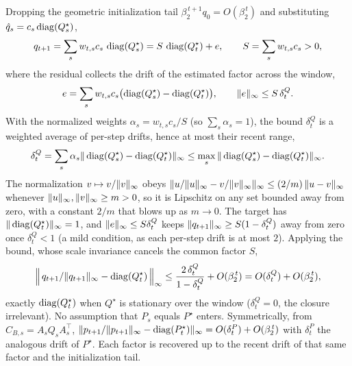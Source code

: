 Dropping the geometric initialization tail $\beta_2^{\,t+1}q_0=O(\beta_2^{\,t})$
and substituting $\hat q_s=c_s\operatorname{diag}(Q^\star_s)$,
\[
  q_{t+1}
  =\sum_s w_{t,s}c_s\,\operatorname{diag}(Q^\star_s)
  =S\,\operatorname{diag}(Q^\star_t)+e,
  \qquad
  S=\sum_s w_{t,s}c_s>0,
\]
where the residual collects the drift of the estimated factor across the window,
\[
  e=\sum_s w_{t,s}c_s\bigl(\operatorname{diag}(Q^\star_s)-\operatorname{diag}(Q^\star_t)\bigr),
  \qquad
  \| e\|_\infty\le S\,\delta^Q_t.
\]
With the normalized weights $\alpha_s=w_{t,s}c_s/S$ (so $\sum_s\alpha_s=1$), the
bound $\delta^Q_t$ is a weighted average of per-step drifts, hence at most their
recent range,
\[
  \delta^Q_t
  =\sum_s\alpha_s\| \operatorname{diag}(Q^\star_s)-\operatorname{diag}(Q^\star_t)\|_\infty
  \le\max_s\| \operatorname{diag}(Q^\star_s)-\operatorname{diag}(Q^\star_t)\|_\infty .
\] The normalization $v\mapsto v/\| v\|_\infty$ obeys
$\| u/\| u\|_\infty-v/\| v\|_\infty\|_\infty\le(2/m)\,\| u-v\|_\infty$
whenever $\| u\|_\infty,\| v\|_\infty\ge m>0$, so it is Lipschitz on any set
bounded away from zero, with a constant $2/m$ that blows up as $m\to0$. The
target has $\| \operatorname{diag}(Q^\star_t)\|_\infty=1$, and $\| e\|_\infty\le
S\delta^Q_t$ keeps $\| q_{t+1}\|_\infty\ge S(1-\delta^Q_t)$ away from zero once
$\delta^Q_t<1$ (a mild condition, as each per-step drift is at most $2$).
Applying the bound, whose scale invariance cancels the common factor $S$,
\[
  \Big\|\,q_{t+1}/\| q_{t+1}\|_\infty-\operatorname{diag}(Q^\star_t)\,\Big\|_\infty
  \le\frac{2\,\delta^Q_t}{1-\delta^Q_t}+O(\beta_2^{\,t})
  =O(\delta^Q_t)+O(\beta_2^{\,t}) ,
\]
exactly $\operatorname{diag}(Q^\star_t)$ when $Q^\star$ is stationary over the window
($\delta^Q_t=0$, the closure irrelevant). No assumption that $P_s$ equals
$P^\star$ enters. Symmetrically, from $C_{B,s}=A_sQ_sA_s^\top$,
$\| p_{t+1}/\| p_{t+1}\|_\infty-\operatorname{diag}(P^\star_t)\|_\infty
=O(\delta^{P}_t)+O(\beta_2^{\,t})$ with $\delta^{P}_t$ the analogous drift of
$P^\star$. Each factor is recovered up to the recent drift of that same factor
and the initialization tail.

